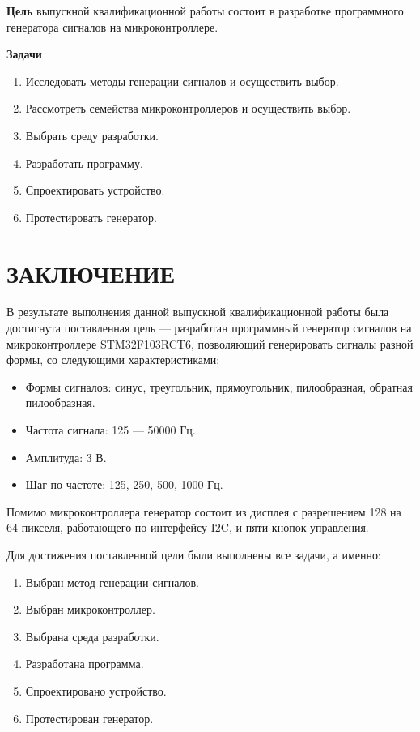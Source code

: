 \documentclass[14pt, oneside]{altsu-bachelor}
\begin{document}
\textbf{Цель}
	выпускной квалификационной работы состоит в разработке программного генератора сигналов на микроконтроллере.

\textbf{Задачи}

	\begin{enumerate}
		\item Исследовать методы генерации сигналов и осуществить выбор.
		\item Рассмотреть семейства микроконтроллеров и осуществить выбор.
		\item Выбрать среду разработки.
		\item Разработать программу.
		\item Спроектировать устройство.
		\item Протестировать генератор.
	\end{enumerate}





\chapter*{ЗАКЛЮЧЕНИЕ}
	В результате выполнения данной выпускной квалификационной работы была достигнута поставленная цель --- разработан программный генератор сигналов на микроконтроллере STM32F103RCT6, позволяющий генерировать сигналы разной формы, со следующими характеристиками:

	\begin{itemize}
		\item Формы сигналов: синус, треугольник, прямоугольник, пилообразная, обратная пилообразная.
		\item Частота сигнала: 125 --- 50000 Гц.
		\item Амплитуда: 3 В.
		\item Шаг по частоте: 125, 250, 500, 1000 Гц.
	\end{itemize}

	Помимо микроконтроллера генератор состоит из дисплея с разрешением 128 на 64 пикселя, работающего по интерфейсу I2C, и пяти кнопок управления.

	Для достижения поставленной цели были выполнены все задачи, а именно:
	\begin{enumerate}
		\item Выбран метод генерации сигналов.
		\item Выбран микроконтроллер.
		\item Выбрана среда разработки.
		\item Разработана программа.
		\item Спроектировано устройство.
		\item Протестирован генератор.
	\end{enumerate}
\end{document}
